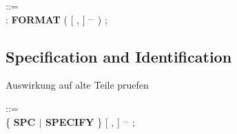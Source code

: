 










 ::= \\
\x {} : {\bf FORMAT} (  [ ,  ] $^{...}$ ) ;\\






        













        


\begin{removed}








\end{removed}

\subsection{Specification and Identification}    %
\begin{discuss}
Auswirkung auf alte Teile pruefen



\end{discuss}


 ::=\\
\x \{ {\bf SPC $\mid$ SPECIFY} \}  [ ,  ] $^{...}$ ;\\


